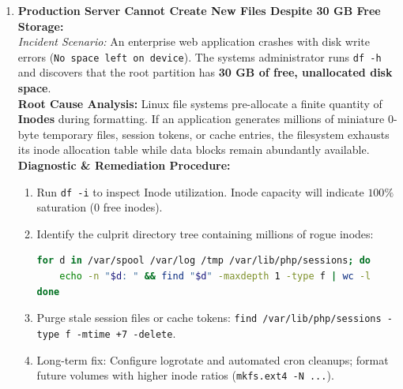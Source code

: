 \begin{enumerate}[label=\textbf{Case \arabic*.},leftmargin=1.5cm]
\item \textbf{Production Server Cannot Create New Files Despite 30 GB Free Storage:} \\
\textit{Incident Scenario:} An enterprise web application crashes with disk write errors (\texttt{No space left on device}). The systems administrator runs \texttt{df -h} and discovers that the root partition has \textbf{30 GB of free, unallocated disk space}. \\
\textbf{Root Cause Analysis:} Linux file systems pre-allocate a finite quantity of \textbf{Inodes} during formatting. If an application generates millions of miniature 0-byte temporary files, session tokens, or cache entries, the filesystem exhausts its inode allocation table while data blocks remain abundantly available. \\
\textbf{Diagnostic \& Remediation Procedure:}
\begin{enumerate}
    \item Run \texttt{df -i} to inspect Inode utilization. Inode capacity will indicate $100\%$ saturation ($0$ free inodes).
    \item Identify the culprit directory tree containing millions of rogue inodes:
\begin{lstlisting}[language=bash]
for d in /var/spool /var/log /tmp /var/lib/php/sessions; do
    echo -n "$d: " && find "$d" -maxdepth 1 -type f | wc -l
done
\end{lstlisting}
    \item Purge stale session files or cache tokens: \texttt{find /var/lib/php/sessions -type f -mtime +7 -delete}.
    \item Long-term fix: Configure logrotate and automated cron cleanups; format future volumes with higher inode ratios (\texttt{mkfs.ext4 -N ...}).
\end{enumerate}


\end{enumerate}
